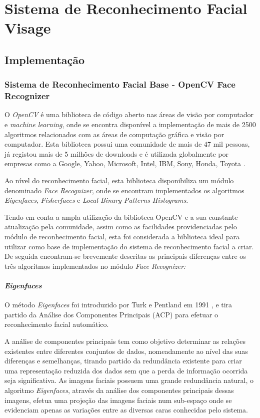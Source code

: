 \chapter{Sistema de Reconhecimento Facial Visage} \label{chap:visage}

\section{Implementação}

\subsection{Sistema de Reconhecimento Facial Base - OpenCV Face Recognizer}
O \textit{OpenCV} é uma biblioteca de código aberto nas áreas de visão por computador e \textit{machine learning}, onde se encontra disponível a implementação de mais de 2500 algoritmos relacionados com as áreas de computação gráfica e visão por computador. Esta biblioteca possui uma comunidade de mais de 47 mil pessoas, já registou mais de 5 milhões de downloads e é utilizada globalmente por empresas como a Google, Yahoo, Microsoft, Intel, IBM, Sony, Honda, Toyota \cite{Team}. 

Ao nível do reconhecimento facial, esta biblioteca disponibiliza um módulo denominado \textit{Face Recognizer}, onde se encontram implementados os algoritmos \textit{Eigenfaces}, \textit{Fisherfaces} e \textit{Local Binary Patterns Histograms}.

Tendo em conta a ampla utilização da biblioteca OpenCV e a sua constante atualização pela comunidade, assim como as facilidades providenciadas pelo módulo de reconhecimento facial, esta foi considerada a biblioteca ideal para utilizar como base de implementação do sistema de reconhecimento facial a criar. De seguida encontram-se brevemente descritas as principais diferenças entre os três algoritmos implementados no módulo \textit{Face Recognizer:}

\subsubsection*{\textit{Eigenfaces}}
O método \textit{Eigenfaces} foi introduzido por Turk e Pentland em 1991 \cite{Turk1991}, e tira partido da Análise dos Componentes Principais (ACP) para efetuar o reconhecimento facial automático.

A análise de componentes principais tem como objetivo determinar as relações existentes entre diferentes conjuntos de dados, nomeadamente ao nível das suas diferenças e semelhanças, tirando partido da redundância existente para criar uma representação reduzida dos dados sem que a perda de informação ocorrida seja significativa. As imagens faciais possuem uma grande redundância natural, o algoritmo \textit{Eigenfaces}, através da análise dos componentes principais dessas imagens, efetua uma projeção das imagens faciais num sub-espaço onde se evidenciam apenas as variações entre as diversas caras conhecidas pelo sistema.

